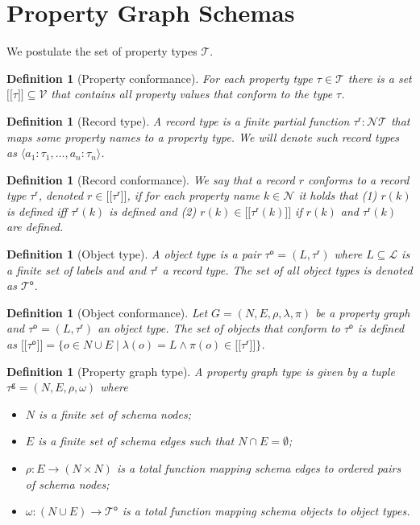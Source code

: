 \documentclass[a4paper]{article}
\makeatletter
\newtheorem{definition}[theorem]{Definition}
\newcommand{\pto}{}%
\DeclareRobustCommand{\pto}{\mathrel{\mathpalette\p@to@gets\to}}
\newcommand{\p@to@gets}[2]{%
  \ooalign{\hidewidth$\m@th#1\mapstochar\mkern5mu$\hidewidth\cr$\m@th#1\to$\cr}%
}
\newcommand{\ptype}{\tau}
\newcommand{\ptypes}{\mathcal{T}}
\newcommand{\rtype}{\tau^\mathsf{r}}
\newcommand{\otype}{\tau^\mathsf{o}}
\newcommand{\otypes}{\mathcal{T}^\mathsf{o}}
\newcommand{\gtype}{\tau^\mathsf{g}}
\newcommand{\lsem}{\ensuremath{[\![}}
\newcommand{\rsem}{\ensuremath{]\!]}}
\newcommand{\sem}[1]{\ensuremath{\lsem #1 \rsem}}
\makeatother
\begin{document}
\section{Property Graph Schemas}

We postulate the set of property types $\mathcal{T}$.

\begin{definition}[Property conformance]
  For each property type $\ptype \in \ptypes$ there is a set $\sem{\ptype} \subseteq \mathcal{V}$ that contains all property values that \emph{conform} to the type $\ptype$.
\end{definition}

\begin{definition}[Record type]
  A \emph{record type} is a finite partial function $\rtype : \mathcal{N} \pto \ptypes$ that maps some property names to a property type.
  We will denote such record types as $\langle a_1 : \ptype_1, \ldots, a_n : \ptype_n \rangle$.
\end{definition}

\begin{definition}[Record conformance]
  We say that a record $r$ \emph{conforms} to a record type $\rtype$, denoted $r \in \sem{\rtype}$, if for each property name $k \in \mathcal{N}$ it holds that (1) $r(k)$ is defined iff $\rtype(k)$ is defined and (2) $r(k) \in \sem{\rtype(k)}$ if $r(k)$ and $\rtype(k)$ are defined.
\end{definition}

\begin{definition}[Object type]
  A \emph{object type} is a pair $\otype = (L, \rtype)$ where $L \subseteq \mathcal{L}$ is a finite set of labels and and $\rtype$ a record type. 
  The set of all object types is denoted as $\otypes$.
\end{definition}

\begin{definition}[Object conformance]
  Let $G = (N, E, \rho, \lambda, \pi)$ be a property graph and $\otype = (L, \rtype)$ an object type. The set of objects that \emph{conform} to $\otype$ is defined as $\sem{\otype} = \{o \in N \cup E \mid \lambda(o) = L \wedge \pi(o) \in \sem{\rtype}\}$.
\end{definition}

\begin{definition}[Property graph type]
  A \emph{property graph type} is given by a tuple $\gtype = (N, E, \rho, \omega)$ where 
  \begin{itemize}
    \item $N$ is a finite set of schema nodes;
    \item $E$ is a finite set of schema edges such that $N \cap E = \emptyset$;
    \item $\rho : E \to (N \times N)$ is a total function mapping schema edges to ordered pairs of schema nodes;
    \item $\omega : (N \cup E) \to \otypes$ is a total function mapping schema objects to object types.
  \end{itemize}
\end{definition}
\end{document}
